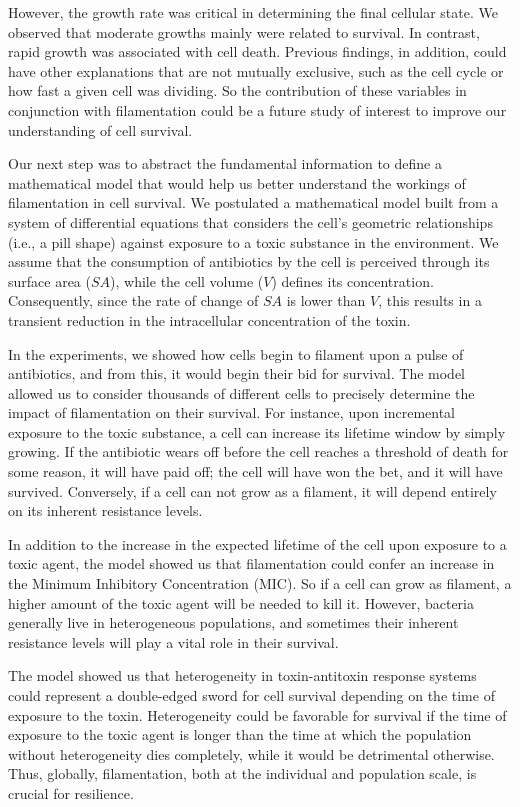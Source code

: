 \documentclass[
  12pt,
  a4paper,
  oneside]{krantz}
\begin{document}
However, the growth rate was critical in determining the final cellular
state. We observed that moderate growths mainly were related to
survival. In contrast, rapid growth was associated with cell death.
Previous findings, in addition, could have other explanations that are
not mutually exclusive, such as the cell cycle or how fast a given cell
was dividing. So the contribution of these variables in conjunction with
filamentation could be a future study of interest to improve our
understanding of cell survival.

Our next step was to abstract the fundamental information to define a
mathematical model that would help us better understand the workings of
filamentation in cell survival. We postulated a mathematical model built
from a system of differential equations that considers the cell's
geometric relationships (i.e., a pill shape) against exposure to a toxic
substance in the environment. We assume that the consumption of
antibiotics by the cell is perceived through its surface area (\(SA\)),
while the cell volume (\(V\)) defines its concentration. Consequently,
since the rate of change of \(SA\) is lower than \(V\), this results in a
transient reduction in the intracellular concentration of the toxin.

In the experiments, we showed how cells begin to filament upon a pulse
of antibiotics, and from this, it would begin their bid for survival.
The model allowed us to consider thousands of different cells to
precisely determine the impact of filamentation on their survival. For
instance, upon incremental exposure to the toxic substance, a cell can
increase its lifetime window by simply growing. If the antibiotic wears
off before the cell reaches a threshold of death for some reason, it
will have paid off; the cell will have won the bet, and it will have
survived. Conversely, if a cell can not grow as a filament, it will
depend entirely on its inherent resistance levels.

In addition to the increase in the expected lifetime of the cell upon
exposure to a toxic agent, the model showed us that filamentation could
confer an increase in the Minimum Inhibitory Concentration (MIC). So if
a cell can grow as filament, a higher amount of the toxic agent will be
needed to kill it. However, bacteria generally live in heterogeneous
populations, and sometimes their inherent resistance levels will play a
vital role in their survival.

The model showed us that heterogeneity in toxin-antitoxin response
systems could represent a double-edged sword for cell survival depending
on the time of exposure to the toxin. Heterogeneity could be favorable
for survival if the time of exposure to the toxic agent is longer than
the time at which the population without heterogeneity dies completely,
while it would be detrimental otherwise. Thus, globally, filamentation,
both at the individual and population scale, is crucial for resilience.
\end{document}
